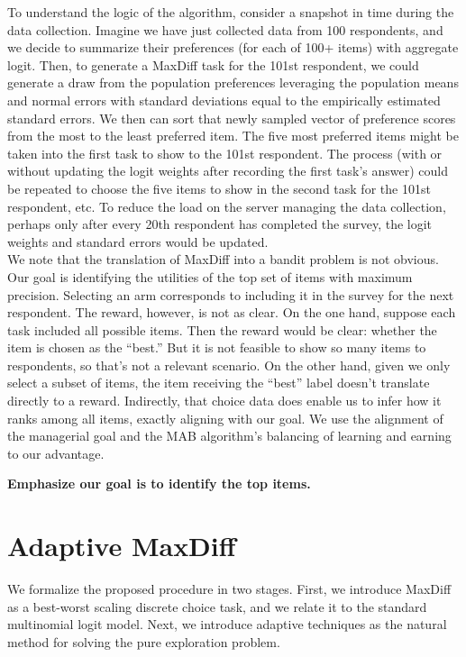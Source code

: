 \documentclass[nonblindrev]{informs3}
\begin{document}
To understand the logic of the algorithm, consider a snapshot in time during the data collection. Imagine we have just collected data from 100 respondents, and we decide to summarize their preferences (for each of 100+ items) with aggregate logit.  Then, to generate a MaxDiff task for the 101st respondent, we could generate a draw from the population preferences leveraging the population means and normal errors with standard deviations equal to the empirically estimated standard errors.  We then can sort that newly sampled vector of preference scores from the most to the least preferred item.  The five most preferred items might be taken into the first task to show to the 101st respondent.  The process (with or without updating the logit weights after recording the first task's answer) could be repeated to choose the five items to show in the second task for the 101st respondent, etc.  To reduce the load on the server managing the data collection, perhaps only after every 20th respondent has completed the survey, the logit weights and standard errors would be updated.\\
We note that the translation of MaxDiff into a bandit problem is not obvious. Our goal is identifying the utilities of the top set of items with maximum precision. Selecting an arm corresponds to including it in the survey for the next respondent. The reward, however, is not as clear. On the one hand, suppose each task included all possible items. Then the reward would be clear: whether the item is chosen as the ``best.'' But it is not feasible to show so many items to respondents, so that's not a relevant scenario. On the other hand, given we only select a subset of items, the item receiving the ``best'' label doesn't translate directly to a reward. Indirectly, that choice data does enable us to infer how it ranks among all items, exactly aligning with our goal. We use the alignment of the managerial goal and the MAB algorithm's balancing of learning and earning to our advantage.

\textbf{Emphasize our goal is to identify the top items.}

\section{Adaptive MaxDiff}
We formalize the proposed procedure in two stages. First, we introduce MaxDiff as a best-worst scaling discrete choice task, and we relate it to the standard multinomial logit model. Next, we introduce adaptive techniques as the natural method for solving the pure exploration problem.
\end{document}
